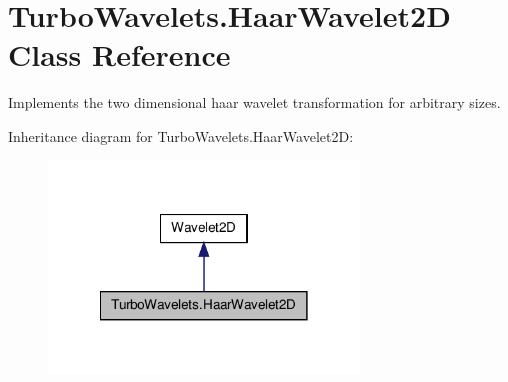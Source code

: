\hypertarget{class_turbo_wavelets_1_1_haar_wavelet2_d}{\section{\-Turbo\-Wavelets.\-Haar\-Wavelet2\-D \-Class \-Reference}
\label{class_turbo_wavelets_1_1_haar_wavelet2_d}
}


\-Implements the two dimensional haar wavelet transformation for arbitrary sizes.  




\-Inheritance diagram for \-Turbo\-Wavelets.\-Haar\-Wavelet2\-D\-:
\nopagebreak
\begin{figure}[H]
\begin{center}
\leavevmode
\includegraphics[width=234pt]{class_turbo_wavelets_1_1_haar_wavelet2_d__inherit__graph}
\end{center}
\end{figure}

